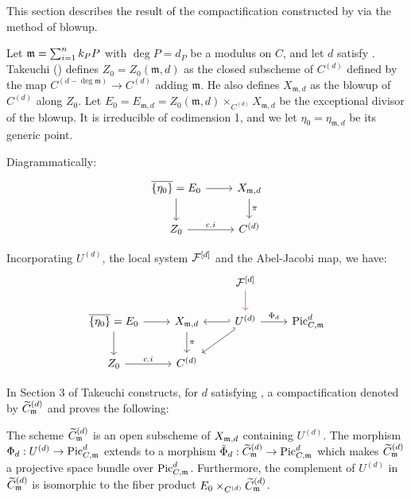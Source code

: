 This section describes the result of the compactification constructed by \cite{takeuchi2018blow}
via the method of blowup.

Let $\mdls = \sum_{i=1}^n k_P P$ with $\deg P = d_P$ be a modulus on $C$, and let $d$ satisfy
.
Takeuchi (\cite{takeuchi2018blow}) defines $Z_0=Z_0(\mathfrak{m}, d)$ as the closed subscheme of
$C^{(d)}$ defined by the map $C^{(d - \deg \mathfrak{m})} \to C^{(d)}$ adding $\mathfrak{m}$.
He also defines $X_{\mathfrak{m}, d}$ as the blowup of $C^{(d)}$ along $Z_0$.
Let $E_0 = E_{\mathfrak{m},d} = Z_0(\mathfrak{m}, d) \times_{C^{(d)}} X_{\mathfrak{m}, d}$ be the exceptional divisor of the blowup. It is irreducible of codimension 1, and we let $\eta_0=\eta_{\mathfrak{m}, d}$ be its generic point.

Diagrammatically:
\[\begin{tikzcd}
\overline{\{\eta_0 \}} =  E_0 \arrow[r] \arrow[d] & X_{\mdls, d} \arrow[d, "\pi"] \\
Z_0 \arrow[r, "c.i"]           & C^{(d)}
\end{tikzcd}\]

Incorporating $U^{(d)}$, the local system $\cF^{[d]}$ and the Abel-Jacobi map, we have:
\[
\begin{tikzcd}
    & & \cF^{[d]} \arrow[d, purple]\\
\overline{\{\eta_0 \}} =  E_0 \arrow[r] \arrow[d] &
X_{\mdls, d} \arrow[d, "\pi"]  & \arrow[l, hook'] \arrow[dl, hook'] U^{(d)} \arrow[r, "\Phi_d"] & \PicCm[d] \\
Z_0 \arrow[r, "c.i"]           & C^{(d)}
\end{tikzcd}
\]

In Section 3 of \cite{takeuchi2018blow} Takeuchi constructs, for $d$ satisfying , a compactification denoted by $\Cmod{d}$ and proves the following:

\begin{theorem}[Takeuchi]\label{theorem:takeuchi-compactification-theorem}
    The scheme $\Cmod{d}$ is an open subscheme of $X_{\mdls,d}$ containing $U^{(d)}$.
    The morphism $\Phi_d: U^{(d)} \to \PicCm[d]$ extends to a morphism $\tilde{\Phi}_d: \Cmod{d} \to \PicCm[d]$ which makes
    $\Cmod{d}$ a projective space bundle over $\PicCm[d]$.
    Furthermore, the complement of $U^{(d)}$ in $\Cmod{d}$ is isomorphic to the fiber product
    $E_0 \times_{C^{(d)}} \Cmod{d}$.
\end{theorem}

